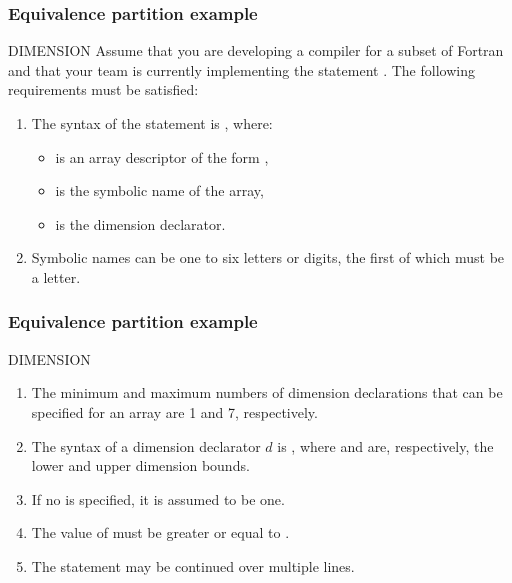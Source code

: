 \begin{frame}[hasprev=false, hasnext=true]
\frametitle{Equivalence partition example}

\begin{block:fact}{DIMENSION}
Assume that you are developing a compiler for a subset of Fortran and
that your team is currently implementing the statement
. The following requirements must be satisfied:

\begin{enumerate}
	\item The syntax of the  statement is
	, where:
	\begin{itemize}
		\item {} is an array descriptor of the form
		,

		\item {} is the symbolic name of the array,

		\item {} is the dimension declarator.
	\end{itemize}

	\item Symbolic names can be one to six letters or digits, the first of
	which must be a letter.
\end{enumerate}
\end{block:fact}
\end{frame}


\begin{frame}[hasprev=false, hasnext=true]
\frametitle{Equivalence partition example}

\begin{block:fact}{DIMENSION}
\begin{enumerate}
	\item The minimum and maximum numbers of dimension declarations that can
	be specified for an array are 1 and 7, respectively.

	\item The syntax of a dimension declarator $d$ is , where
	 and  are, respectively, the lower and upper
	dimension bounds.

	\item If no  is specified, it is assumed to be one.

	\item The value of  must be greater or equal to .

	\item The  statement may be continued over multiple
	lines.
\end{enumerate}
\end{block:fact}
\end{frame}


